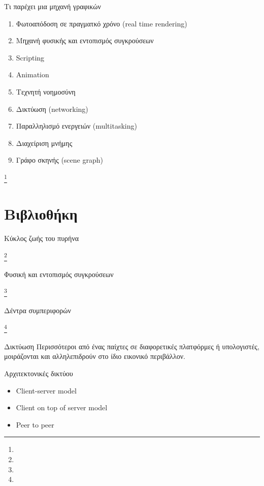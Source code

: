 \documentclass{beamer}
\newcommand\blfootnote[1]{%
	\begingroup
	\renewcommand\thefootnote{}\footnote{#1}%
	\addtocounter{footnote}{-1}%
	\endgroup
}
\begin{document}
	\begin{frame}{Τι παρέχει μια μηχανή γραφικών}		
	\begin{enumerate}
		\item Φωτοαπόδοση σε πραγματκό χρόνο (real time rendering)
		\item Mηχανή φυσικής και εντοπισμός συγκρούσεων
		\item Scripting
		\item Animation
		\item Τεχνητή νοημοσύνη
		\item Δικτύωση (networking)
		\item Παραλληλισμό ενεργειών (multitasking)
		\item Διαχείριση μνήμης
		\item Γράφο σκηνής (scene graph)
	\end{enumerate}
	\blfootnote{}
	\end{frame}
		
	\section{Bιβλιοθήκη}
		
	\begin{frame}{Κύκλος ζωής του πυρήνα}
		\begin{figure}
			\centering
			\resizebox{4.8cm}{!}{}
		\end{figure}
		\blfootnote{}	
	\end{frame}

	\begin{frame}{Φυσική και εντοπισμός συγκρούσεων}
		\begin{figure}
			\centering
			\resizebox{10.5cm}{!}{}
		\end{figure}
		\blfootnote{}
	\end{frame}
	
	\begin{frame}{Δέντρα συμπεριφορών}
		\begin{figure}
			\centering
			\resizebox{10.5cm}{!}{}
		\end{figure}
		\blfootnote{}
	\end{frame}

	\begin{frame}{Δικτύωση}
		Περισσότεροι από ένας παίχτες σε διαφορετικές πλατφόρμες ή υπολογιστές, μοιράζονται και αλληλεπιδρούν στο ίδιο εικονικό περιβάλλον.
		
		\alert{Αρχιτεκτονικές δικτύου} 		
		\begin{itemize}
			\item Client-server model
			\item Client on top of server model
			\item Peer to peer
		\end{itemize}			
	
	\end{frame}
	
\end{document}
